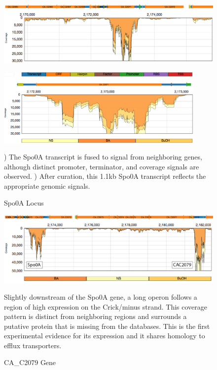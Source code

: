 \begin{figure}
\small
{\includegraphics[width=\textwidth,height=1.5in]{images/Assembly/Examples/Spo0A/Spo0A-locus.png}
\label{fig:5.18a}}
{\includegraphics[width=\textwidth,height=1.5in]{images/Assembly/Examples/Spo0A/Spo0A-curated.png}
\label{fig:5.18b}}
\caption{Spo0A Locus}
) The Spo0A transcript is fused to signal from neighboring genes, although distinct promoter, terminator, and coverage signals are observed. ) After curation, this 1.1kb Spo0A transcript reflects the appropriate genomic signals.
\end{figure}


\begin{figure}
\small
\includegraphics[width=\textwidth]{images/Assembly/Examples/Spo0A/CAC2079.png}
\caption{CA_C2079 Gene}\label{fig:5.19}
Slightly downstream of the Spo0A gene, a long operon follows a region of high expression on the Crick/minus strand. This coverage pattern is distinct from neighboring regions and surrounds a putative protein that is missing from the databases. This is the first experimental evidence for its expression and it shares homology to efflux transporters.
\end{figure}

